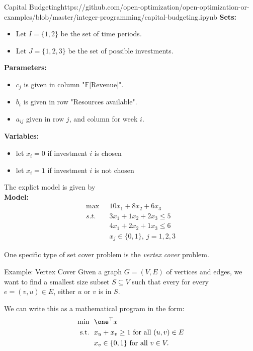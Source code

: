 
\begin{examplewithcode}{Capital Budgeting}{https://github.com/open-optimization/open-optimization-or-examples/blob/master/integer-programming/capital-budgeting.ipynb}
\noindent \textbf{Sets:}
\begin{itemize}
\item Let $I = \{1,2\}$ be the set of time periods.
\item Let $J = \{1, 2,3\}$ be the set of possible investments.
\end{itemize}

\noindent \textbf{Parameters:}
\begin{itemize}
\item $c_j$ is given in column "$\mathbb{E}$[Revenue]".
\item $b_i$ is given in row "Resources available".
\item $a_{ij}$ given in row $j$, and column for week $i$.
\end{itemize}

\noindent \textbf{Variables:}
\begin{itemize}
\item let $x_i = 0$ if investment $i$ is chosen
\item let $x_i = 1$ if investment $i$ is not chosen
\end{itemize}

The explict model is given by\\
\noindent  \textbf{Model:}
\begin{align*}
	\max\ \ \  & 10x_1+8x_2+6x_3 \tag{Total Expected Revenue}\\
	s.t. \ \ & 
	3x_1+1x_2+2x_3\leq5 \tag{ Resource constraint week 1}\\
	&4x_1+2x_2+1x_3\leq6 \tag{ Resource constraint week 2}\\
&x_j \in \{0,1\},\  j = 1,2,3
\end{align*}

\end{examplewithcode}




One specific type of set cover problem is the \emph{vertex cover} problem.
\begin{general}{Example: Vertex Cover}{\npcomplete}
\label{ex:vertex-cover}
Given a graph $G = (V,E)$ of vertices and edges, we want to find a smallest size subset $S \subseteq V$ such that every for every $e = (v,u) \in E$, either $u$ or $v$ is in $S$.   

We can write this as a mathematical program in the form:
\begin{equation}
\begin{split}
\min \ \ & \one^\top x\\
\text{s.t.} \ \ & x_u + x_v \geq 1 \text{ for all } (u,v) \in E \\ 
& x_v \in \{0,1\} \text{ for all } v \in V.
\end{split}
\end{equation}
\end{general}




